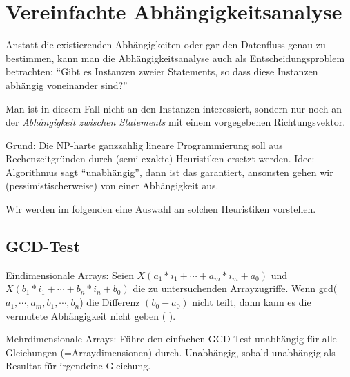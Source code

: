\section{Vereinfachte Abhängigkeitsanalyse}

Anstatt die existierenden Abhängigkeiten oder gar den Datenfluss genau
zu bestimmen, kann man die Abhängigkeitsanalyse auch als
Entscheidungsproblem betrachten: ``Gibt es Instanzen zweier
Statements, so dass diese Instanzen abhängig voneinander sind?''

Man ist in diesem Fall nicht an den Instanzen interessiert, sondern
nur noch an der \emph{Abhängigkeit zwischen Statements} mit einem
vorgegebenen Richtungsvektor.

Grund: Die NP-harte ganzzahlig lineare Programmierung soll aus
Rechenzeitgründen durch (semi-exakte) Heuristiken ersetzt werden.
Idee: Algorithmus sagt ``unabhängig'', dann ist das garantiert,
ansonsten gehen wir (pessimistischerweise) von einer Abhängigkeit aus.

Wir werden im folgenden eine Auswahl an solchen Heuristiken
vorstellen.


\subsection{GCD-Test \cite{Ban93}}
Eindimensionale Arrays: Seien $X(a_1*i_1+\cdots+a_m*i_m+a_0)$ und
$X(b_1*i_1+\cdots+b_n*i_n+b_0)$ die zu untersuchenden Arrayzugriffe.
Wenn gcd($a_1,\cdots,a_m,b_1,\cdots,b_n$) die Differenz $(b_0-a_0)$
nicht teilt, dann kann es die vermutete Abhängigkeit nicht geben
( ).

\smallskip
Mehrdimensionale Arrays: Führe den einfachen GCD-Test unabhängig für
alle Gleichungen (=Arraydimensionen) durch. Unabhängig, sobald
unabhängig als Resultat für irgendeine Gleichung.



